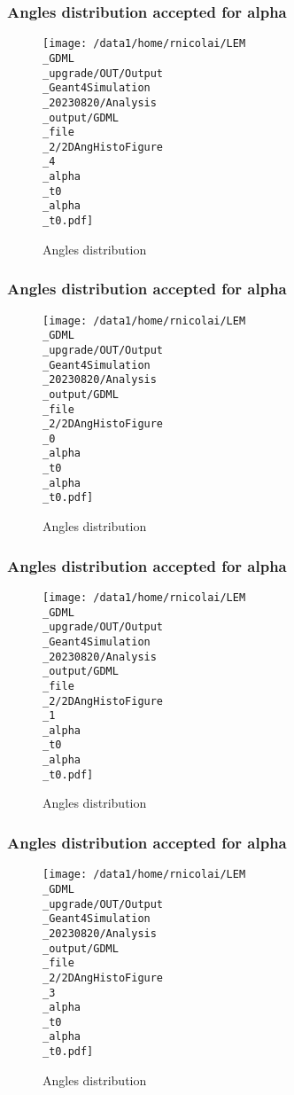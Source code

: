 \documentclass[8pt]{beamer}
\begin{document}
            \begin{frame}
                \frametitle{Angles distribution accepted for alpha}
            
        \begin{figure}[h]
            \centering
            \texttt{[image: /data1/home/rnicolai/LEM\\\_GDML\\\_upgrade/OUT/Output\\\_Geant4Simulation\\\_20230820/Analysis\\\_output/GDML\\\_file\\\_2/2DAngHistoFigure\\\_4\\\_alpha\\\_t0\\\_alpha\\\_t0.pdf]}
            \caption{Angles distribution}
        \end{figure}
        
            \end{frame}
            
            \begin{frame}
                \frametitle{Angles distribution accepted for alpha}
            
        \begin{figure}[h]
            \centering
            \texttt{[image: /data1/home/rnicolai/LEM\\\_GDML\\\_upgrade/OUT/Output\\\_Geant4Simulation\\\_20230820/Analysis\\\_output/GDML\\\_file\\\_2/2DAngHistoFigure\\\_0\\\_alpha\\\_t0\\\_alpha\\\_t0.pdf]}
            \caption{Angles distribution}
        \end{figure}
        
            \end{frame}
            
            \begin{frame}
                \frametitle{Angles distribution accepted for alpha}
            
        \begin{figure}[h]
            \centering
            \texttt{[image: /data1/home/rnicolai/LEM\\\_GDML\\\_upgrade/OUT/Output\\\_Geant4Simulation\\\_20230820/Analysis\\\_output/GDML\\\_file\\\_2/2DAngHistoFigure\\\_1\\\_alpha\\\_t0\\\_alpha\\\_t0.pdf]}
            \caption{Angles distribution}
        \end{figure}
        
            \end{frame}
            
            \begin{frame}
                \frametitle{Angles distribution accepted for alpha}
            
        \begin{figure}[h]
            \centering
            \texttt{[image: /data1/home/rnicolai/LEM\\\_GDML\\\_upgrade/OUT/Output\\\_Geant4Simulation\\\_20230820/Analysis\\\_output/GDML\\\_file\\\_2/2DAngHistoFigure\\\_3\\\_alpha\\\_t0\\\_alpha\\\_t0.pdf]}
            \caption{Angles distribution}
        \end{figure}
        
            \end{frame}
            
\end{document}
